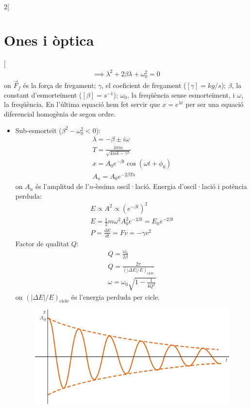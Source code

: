 \documentclass[class=article,10pt,crop=false]{standalone}
\begin{document}
\begin{multicols}{2}[\section{Ones i òptica}]
\begin{gather*}
    \implies\lambda^2+2\beta\lambda+\omega_0^2=0
\end{gather*}
{\footnotesize on $\Vec{F}_f$ és la força de fregament; $\gamma$, el coeficient de fregament ($[\gamma]=kg/s$); $\beta$, la constant d'esmorteïment ($[\beta]=s^{-1}$); $\omega_0$, la freqüència sense esmorteïment, i $\omega$, la freqüència. En l'última equació hem fet servir que $x=e^{\lambda t}$ per ser una equació diferencial homogènia de segon ordre.}
\begin{itemize}
    \item Sub-esmorteït ($\beta^2-\omega_0^2<0$):
    \begin{gather*}
        \lambda=-\beta\pm i\omega\\
        T=\frac{4\pi m}{\sqrt{4mk-\gamma^2}}\\
        x=A_0e^{-\beta t}\cos(\omega t+\phi_0)\\
        A_n=A_0e^{-2\beta Tn}
    \end{gather*} {\footnotesize on $A_n$ és l'amplitud de l'$n$-èssima oscil·lació.}\newline
    Energia d'oscil·lació i potència perduda:
    \begin{gather*}
        E\propto A^2\propto (e^{-\beta t})^2\\
        E=\frac{1}{2}m\omega^2A_0^2e^{-2\beta t}=E_0e^{-2\beta t}\\
        P=\frac{dE}{dt}=Fv=-\gamma v^2
    \end{gather*}
    Factor de qualitat $Q$:
    \begin{gather*}
        Q=\frac{\omega_0}{2\beta}\\
        Q=\frac{2\pi}{(|\Delta E|/E)_{\text{cicle}}}\\
        \omega=\omega_0\sqrt{1-\frac{1}{4Q^2}}
    \end{gather*} {\footnotesize on $(|\Delta E|/E)_{\text{cicle}}$ és l'energia perduda per cicle.}\newline
    \begin{figure}
       \centering
       \includegraphics[width=\linewidth]{Physics/1st/Ones_i_optica/Imatges/udamp.jpg}

\end{figure}
\end{itemize}
\end{multicols}
\end{document}
